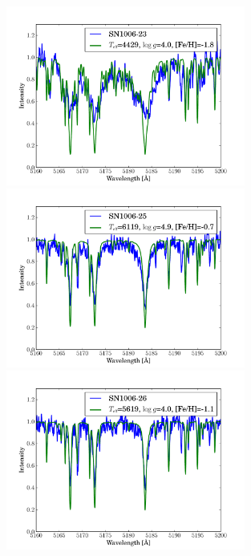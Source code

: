 \begin{figure}[htbp]
   \label{fig:sn1006_candfit}
\end{figure}\begin{figure}[htbp] %
   \centering
\includegraphics[width=0.7\textwidth, trim=0 0mm 0 10mm, clip]{chapter_sn1006/plots/gold_spectra/sn1006_23.pdf}
\includegraphics[width=0.7\textwidth, trim=0 0mm 0 10mm, clip]{chapter_sn1006/plots/gold_spectra/sn1006_25.pdf}
\includegraphics[width=0.7\textwidth, trim=0 0mm 0 10mm, clip]{chapter_sn1006/plots/gold_spectra/sn1006_26.pdf}


\end{figure}
